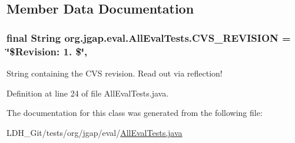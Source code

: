 \subsection{Member Data Documentation}
\hypertarget{classorg_1_1jgap_1_1eval_1_1_all_eval_tests_a58f0205f02f08e6ade4063a742b73601}{
\subsubsection[{C\-V\-S\-\_\-\-R\-E\-V\-I\-S\-I\-O\-N}]{\setlength{\rightskip}{0pt plus 5cm}final String org.\-jgap.\-eval.\-All\-Eval\-Tests.\-C\-V\-S\-\_\-\-R\-E\-V\-I\-S\-I\-O\-N = \char`\"{}\$Revision\-: 1. \$\char`\"{}\hspace{0.3cm}{\ttfamily [static]}, {\ttfamily [private]}}}\label{classorg_1_1jgap_1_1eval_1_1_all_eval_tests_a58f0205f02f08e6ade4063a742b73601}
String containing the C\-V\-S revision. Read out via reflection! 

Definition at line 24 of file All\-Eval\-Tests.\-java.



The documentation for this class was generated from the following file\-:\begin{DoxyCompactItemize}
\item 
L\-D\-H\-\_\-\-Git/tests/org/jgap/eval/\hyperlink{_all_eval_tests_8java}{All\-Eval\-Tests.\-java}\end{DoxyCompactItemize}
